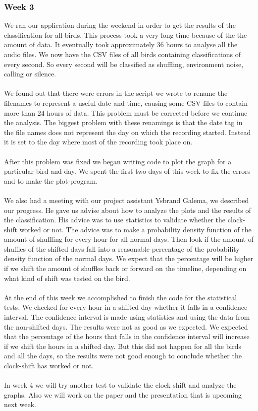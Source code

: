 \documentclass[a4paper]{article}
\begin{document}
\subsubsection*{Week 3}
We ran our application during the weekend in order to get the results of the classification for all birds. This process took a very long time because of the the amount of data. It eventually took approximately 36 hours to analyse all the audio files. We now have the CSV files of all birds containing classifications of every second. So every second will be classified as shuffling, environment noise, calling or silence.\\\\
 We found out that there were errors in the script we wrote to rename the filenames to represent a useful date and time, causing some CSV files to contain more than 24 hours of data. This problem must be corrected before we continue the analysis. The biggest problem with these renamings is that the date tag in the file names does not represent the day on which the recording started. Instead it is set to the day where most of the recording took place on.\\\\
After this problem was fixed we began writing code to plot the graph for a particular bird and day. We spent the first two days of this week to fix the errors and to make the plot-program.\\\\
We also had a meeting with our project assistant Ysbrand Galema, we described our progress. He gave us advise about how to analyze the plots and the results of the classification. His advice was to use statistics to validate whether the clock-shift worked or not. The advice was to make a probability density function of the amount of shuffling for every hour for all normal days. Then look if the amount of shuffles of the shifted days fall into a reasonable percentage of the probability density function of the normal days. We expect that the percentage will be higher if we shift the amount of shuffles back or forward on the timeline, depending on what kind of shift was tested on the bird.\\\\
At the end of this week we accomplished to finish the code for the statistical tests. We checked for every hour in a shifted day whether it falls in a confidence interval. The confidence interval is made using statistics and using the data from the non-shifted days. The results were not as good as we expected. We expected that the percentage of the hours that falls in the confidence interval will increase if we shift the hours in a shifted day. But this did not happen for all the birds and all the days, so the results were not good enough to conclude whether the clock-shift has worked or not.\\\\In week 4 we will try another test to validate the clock shift and analyze the graphs. Also we will work on the paper and the presentation that is upcoming next week.  
\end{document}
